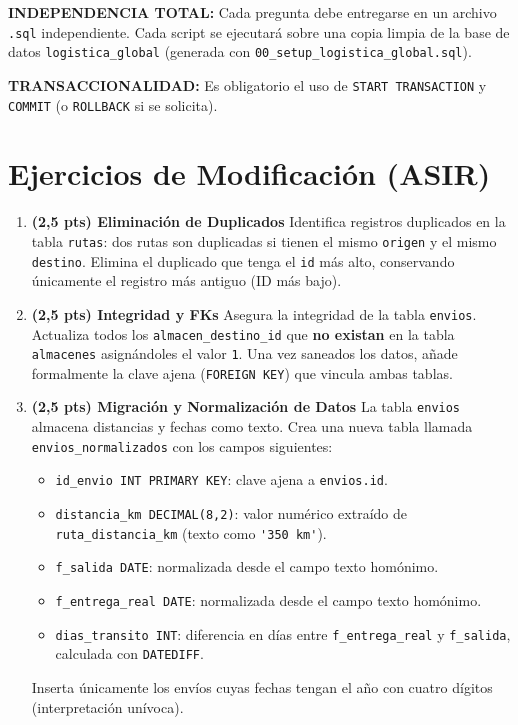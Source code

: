 \documentclass[a4paper,11pt]{article}
\begin{document}
\begin{Form}
\begin{tcolorbox}[colframe=alert, title=INSTRUCCIONES CRÍTICAS]
\textbf{INDEPENDENCIA TOTAL:} Cada pregunta debe entregarse en un archivo \texttt{.sql} independiente. Cada script se ejecutará sobre una copia limpia de la base de datos \texttt{logistica\_global} (generada con \texttt{00\_setup\_logistica\_global.sql}).
\par\medskip
\textbf{TRANSACCIONALIDAD:} Es obligatorio el uso de \texttt{START TRANSACTION} y \texttt{COMMIT} (o \texttt{ROLLBACK} si se solicita).
\end{tcolorbox}

\section{Ejercicios de Modificación (ASIR)}

\begin{enumerate}[leftmargin=*, label=\textbf{Pregunta \arabic*:}]

    \item \textbf{(2,5 pts) Eliminación de Duplicados}
    Identifica registros duplicados en la tabla \texttt{rutas}: dos rutas son duplicadas si tienen el mismo \texttt{origen} y el mismo \texttt{destino}. Elimina el duplicado que tenga el \texttt{id} más alto, conservando únicamente el registro más antiguo (ID más bajo).

    \item \textbf{(2,5 pts) Integridad y FKs}
    Asegura la integridad de la tabla \texttt{envios}. Actualiza todos los \texttt{almacen\_destino\_id} que \textbf{no existan} en la tabla \texttt{almacenes} asignándoles el valor \texttt{1}. Una vez saneados los datos, añade formalmente la clave ajena (\texttt{FOREIGN KEY}) que vincula ambas tablas.

    \item \textbf{(2,5 pts) Migración y Normalización de Datos}
    La tabla \texttt{envios} almacena distancias y fechas como texto. Crea una nueva tabla llamada \texttt{envios\_normalizados} con los campos siguientes:
    \begin{itemize}
        \item \texttt{id\_envio INT PRIMARY KEY}: clave ajena a \texttt{envios.id}.
        \item \texttt{distancia\_km DECIMAL(8,2)}: valor numérico extraído de \texttt{ruta\_distancia\_km} (texto como \lstinline{'350 km'}).
        \item \texttt{f\_salida DATE}: normalizada desde el campo texto homónimo.
        \item \texttt{f\_entrega\_real DATE}: normalizada desde el campo texto homónimo.
        \item \texttt{dias\_transito INT}: diferencia en días entre \texttt{f\_entrega\_real} y \texttt{f\_salida}, calculada con \texttt{DATEDIFF}.
    \end{itemize}
    Inserta únicamente los envíos cuyas fechas tengan el año con cuatro dígitos (interpretación unívoca).


\end{enumerate}
\end{Form}
\end{document}
